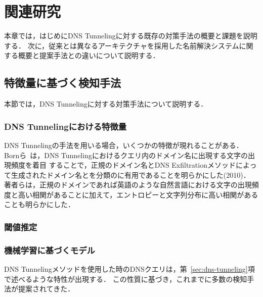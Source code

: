 \section{関連研究}
\label{sec:related-works}
本章では，はじめにDNS Tunnelingに対する既存の対策手法の概要と課題を説明する．
次に，従来とは異なるアーキテクチャを採用した名前解決システムに関する概要と提案手法との違いについて説明する．

\subsection{特徴量に基づく検知手法}
本節では，DNS Tunnelingに対する対策手法について説明する．
\subsubsection{DNS Tunnelingにおける特徴量}
DNS Tunnelingの手法を用いる場合，いくつかの特徴が現れることがある．
Bornら~\cite{born}は，DNS Tunnelingにおけるクエリ内のドメイン名に出現する文字の出現頻度を着目
することで，正規のドメイン名とDNS Exfiltrationメソッドによって生成されたドメイン名とを分類のに有用であることを明らかにした(2010)．
著者らは，正規のドメインであれば英語のような自然言語における文字の出現頻度と高い相関があることに加えて，エントロピーと文字列分布に高い相関があることも明らかにした．


\subsubsection{閾値推定}
\subsubsection{機械学習に基づくモデル}
DNS Tunnelingメソッドを使用した時のDNSクエリは，第~\ref{sec:dns-tunneling}項で述べるような特性が出現する．
この性質に基づき，これまでに多数の検知手法が提案されてきた．


